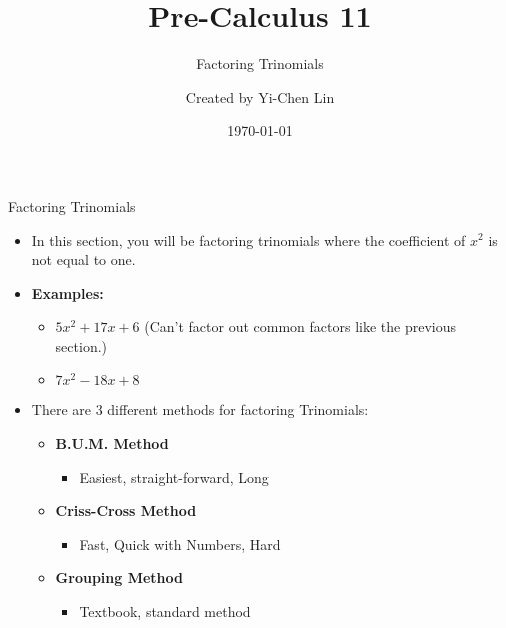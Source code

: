\documentclass[aspectratio=169]{beamer}
\title{Pre-Calculus 11}
\subtitle{Factoring Trinomials}
\author{Created by Yi-Chen Lin}
\date{\today}
\begin{document}
\begin{frame}
    \titlepage
\end{frame}

\begin{frame}{Factoring Trinomials}
    \begin{tcolorbox}[colback=lightgray,colframe=primary,title=Introduction]
        \footnotesize
        \begin{itemize}
            \item In this section, you will be factoring trinomials where the coefficient of $x^2$ is not equal to one.
            \item \textbf{Examples:}
            \begin{itemize}
                \item $5x^2 + 17x + 6$ \hspace{1em} (Can't factor out common factors like the previous section.)
                \item $7x^2 - 18x + 8$
            \end{itemize}
            \item There are 3 different methods for factoring Trinomials:
            \begin{itemize}
                \item \textcolor{accent}{\textbf{B.U.M. Method}}
                \begin{itemize}
                    \item Easiest, straight-forward, Long
                \end{itemize}
                \item \textcolor{accent}{\textbf{Criss-Cross Method}}
                \begin{itemize}
                    \item Fast, Quick with Numbers, Hard
                \end{itemize}
                \item \textcolor{accent}{\textbf{Grouping Method}}
                \begin{itemize}
                    \item Textbook, standard method
                \end{itemize}
            \end{itemize}
        \end{itemize}
    \end{tcolorbox}
\end{frame}
\end{document}
